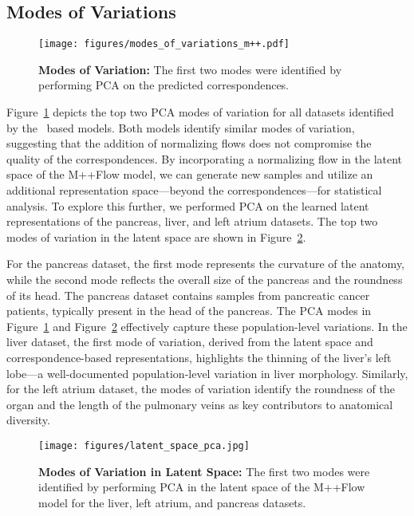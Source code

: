 \subsection{Modes of Variations}
\begin{figure}
    \centering
    \texttt{[image: figures/modes\_of\_variations\_m++.pdf]}
    \caption{\textbf{Modes of Variation:} The first two modes were identified by performing PCA on the predicted correspondences. } %
    \label{fig:data_pca}
\end{figure}
Figure~\ref{fig:data_pca} depicts the top two PCA modes of variation for all datasets identified by the \model~based models. Both models identify similar modes of variation, suggesting that the addition of normalizing flows does not compromise the quality of the correspondences. By incorporating a normalizing flow in the latent space of the M++Flow model, we can generate new samples and utilize an additional representation space—beyond the correspondences—for statistical analysis. To explore this further, we performed PCA on the learned latent representations of the pancreas, liver, and left atrium datasets. The top two modes of variation in the latent space are shown in Figure~\ref{fig:latent_pca}.

For the pancreas dataset, the first mode represents the curvature of the anatomy, while the second mode reflects the overall size of the pancreas and the roundness of its head. The pancreas dataset contains samples from pancreatic cancer patients, typically present in the head of the pancreas. The PCA modes in Figure~\ref{fig:data_pca} and Figure~\ref{fig:latent_pca} effectively capture these population-level variations. In the liver dataset, the first mode of variation, derived from the latent space and correspondence-based representations, highlights the thinning of the liver's left lobe—a well-documented population-level variation in liver morphology. Similarly, for the left atrium dataset, the modes of variation identify the roundness of the organ and the length of the pulmonary veins as key contributors to anatomical diversity.

\begin{figure}
    \centering
    \texttt{[image: figures/latent\_space\_pca.jpg]}
    \caption{\textbf{Modes of Variation in Latent Space:} The first two modes were identified by performing PCA in the latent space of the M++Flow model for the liver, left atrium, and pancreas datasets.}
    \label{fig:latent_pca}
\end{figure}

